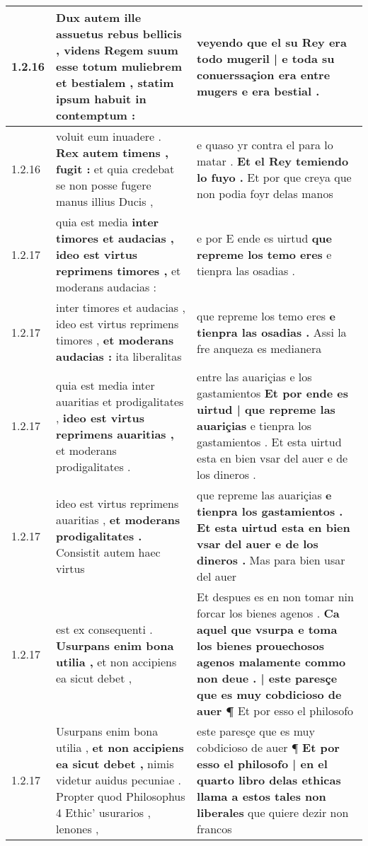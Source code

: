 \begin{tabular}{|p{1cm}|p{6.5cm}|p{6.5cm}|}
1.2.16 & Dux autem ille assuetus rebus bellicis , \textbf{ videns Regem suum esse totum muliebrem et bestialem , } statim ipsum habuit in contemptum : & veyendo \textbf{ que el su Rey era todo mugeril | e toda su } conuerssaçion era entre mugers e era bestial . \\\hline
1.2.16 & voluit eum inuadere . \textbf{ Rex autem timens , fugit : } et quia credebat se non posse fugere manus illius Ducis , & e quaso yr contra el para lo matar . \textbf{ Et el Rey temiendo lo fuyo . } Et por que creya que non podia foyr delas manos \\\hline
1.2.17 & quia est media \textbf{ inter timores et audacias , ideo est virtus reprimens timores , } et moderans audacias : & e por E ende es uirtud \textbf{ que repreme los temo eres } e tienpra las osadias . \\\hline
1.2.17 & inter timores et audacias , ideo est virtus reprimens timores , \textbf{ et moderans audacias : } ita liberalitas & que repreme los temo eres \textbf{ e tienpra las osadias . } Assi la fre anqueza es medianera \\\hline
1.2.17 & quia est media inter auaritias et prodigalitates , \textbf{ ideo est virtus reprimens auaritias , } et moderans prodigalitates . & entre las auariçias e los gastamientos \textbf{ Et por ende es uirtud | que repreme las auariçias } e tienpra los gastamientos . Et esta uirtud esta en bien vsar del auer e de los dineros . \\\hline
1.2.17 & ideo est virtus reprimens auaritias , \textbf{ et moderans prodigalitates . } Consistit autem haec virtus & que repreme las auariçias \textbf{ e tienpra los gastamientos . Et esta uirtud esta en bien vsar del auer e de los dineros . } Mas para bien usar del auer \\\hline
1.2.17 & est ex consequenti . \textbf{ Usurpans enim bona utilia , } et non accipiens ea sicut debet , & Et despues es en non tomar nin forcar los bienes agenos . \textbf{ Ca aquel que vsurpa e toma los bienes prouechosos agenos malamente commo non deue . | este paresçe que es muy cobdicioso de auer ¶ } Et por esso el philosofo \\\hline
1.2.17 & Usurpans enim bona utilia , \textbf{ et non accipiens ea sicut debet , } nimis videtur auidus pecuniae . Propter quod Philosophus 4 Ethic’ usurarios , lenones , & este paresçe que es muy cobdicioso de auer ¶ \textbf{ Et por esso el philosofo | en el quarto libro delas ethicas llama a estos tales non liberales } que quiere dezir non francos \\\hline

\end{tabular}

